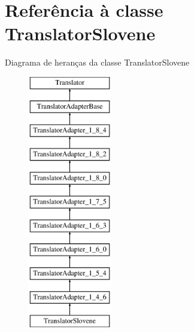 \hypertarget{class_translator_slovene}{\section{Referência à classe Translator\-Slovene}
\label{class_translator_slovene}
}
Diagrama de heranças da classe Translator\-Slovene\begin{figure}[H]
\begin{center}
\leavevmode
\includegraphics[height=11.000000cm]{class_translator_slovene}
\end{center}
\end{figure}

